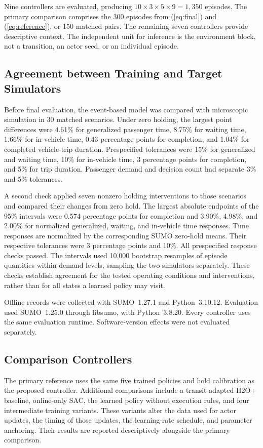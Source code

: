 \documentclass[letterpaper,journal]{IEEEtran}
\begin{document}
Nine controllers are evaluated, producing \(10\times3\times5\times9=1{,}350\) episodes. The primary comparison comprises the 300 episodes from (\ref{eq:final}) and (\ref{eq:reference}), or 150 matched pairs. The remaining seven controllers provide descriptive context. The independent unit for inference is the environment block, not a transition, an actor seed, or an individual episode.

\subsection{Agreement between Training and Target Simulators}
Before final evaluation, the event-based model was compared with microscopic simulation in 30 matched scenarios. Under zero holding, the largest point differences were 4.61\% for generalized passenger time, 8.75\% for waiting time, 1.66\% for in-vehicle time, 0.43 percentage points for completion, and 1.04\% for completed vehicle-trip duration. Prespecified tolerances were 15\% for generalized and waiting time, 10\% for in-vehicle time, 3 percentage points for completion, and 5\% for trip duration. Passenger demand and decision count had separate 3\% and 5\% tolerances.

A second check applied seven nonzero holding interventions to those scenarios and compared their changes from zero hold. The largest absolute endpoints of the 95\% intervals were 0.574 percentage points for completion and 3.90\%, 4.98\%, and 2.00\% for normalized generalized, waiting, and in-vehicle time responses. Time responses are normalized by the corresponding SUMO zero-hold means. Their respective tolerances were 3 percentage points and 10\%. All prespecified response checks passed. The intervals used 10,000 bootstrap resamples of episode quantities within demand levels, sampling the two simulators separately. These checks establish agreement for the tested operating conditions and interventions, rather than for all states a learned policy may visit.

Offline records were collected with SUMO~1.27.1 and Python~3.10.12. Evaluation used SUMO~1.25.0 through libsumo, with Python~3.8.20. Every controller uses the same evaluation runtime. Software-version effects were not evaluated separately.

\subsection{Comparison Controllers}
The primary reference uses the same five trained policies and hold calibration as the proposed controller. Additional comparisons include a transit-adapted H2O+ baseline, online-only SAC, the learned policy without execution rules, and four intermediate training variants. These variants alter the data used for actor updates, the timing of those updates, the learning-rate schedule, and parameter anchoring. Their results are reported descriptively alongside the primary comparison.
\end{document}
